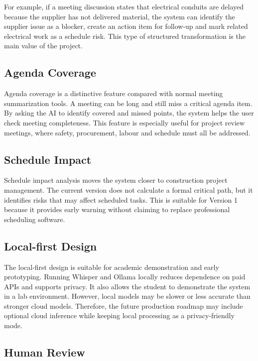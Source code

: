 \documentclass[11pt,a4paper]{article}
\begin{document}
For example, if a meeting discussion states that electrical conduits are delayed because the supplier has not delivered material, the system can identify the supplier issue as a blocker, create an action item for follow-up and mark related electrical work as a schedule risk. This type of structured transformation is the main value of the project.

\subsection{Agenda Coverage}

Agenda coverage is a distinctive feature compared with normal meeting summarization tools. A meeting can be long and still miss a critical agenda item. By asking the AI to identify covered and missed points, the system helps the user check meeting completeness. This feature is especially useful for project review meetings, where safety, procurement, labour and schedule must all be addressed.

\subsection{Schedule Impact}

Schedule impact analysis moves the system closer to construction project management. The current version does not calculate a formal critical path, but it identifies risks that may affect scheduled tasks. This is suitable for Version 1 because it provides early warning without claiming to replace professional scheduling software.

\subsection{Local-first Design}

The local-first design is suitable for academic demonstration and early prototyping. Running Whisper and Ollama locally reduces dependence on paid APIs and supports privacy. It also allows the student to demonstrate the system in a lab environment. However, local models may be slower or less accurate than stronger cloud models. Therefore, the future production roadmap may include optional cloud inference while keeping local processing as a privacy-friendly mode.

\subsection{Human Review}
\end{document}
